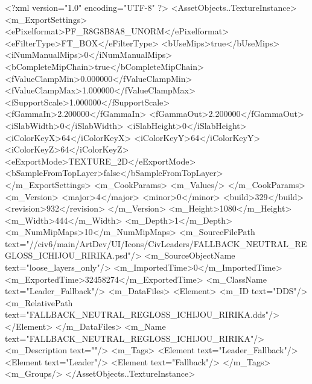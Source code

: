 <?xml version="1.0" encoding="UTF-8" ?>
<AssetObjects..TextureInstance>
	<m_ExportSettings>
		<ePixelformat>PF_R8G8B8A8_UNORM</ePixelformat>
		<eFilterType>FT_BOX</eFilterType>
		<bUseMips>true</bUseMips>
		<iNumManualMips>0</iNumManualMips>
		<bCompleteMipChain>true</bCompleteMipChain>
		<fValueClampMin>0.000000</fValueClampMin>
		<fValueClampMax>1.000000</fValueClampMax>
		<fSupportScale>1.000000</fSupportScale>
		<fGammaIn>2.200000</fGammaIn>
		<fGammaOut>2.200000</fGammaOut>
		<iSlabWidth>0</iSlabWidth>
		<iSlabHeight>0</iSlabHeight>
		<iColorKeyX>64</iColorKeyX>
		<iColorKeyY>64</iColorKeyY>
		<iColorKeyZ>64</iColorKeyZ>
		<eExportMode>TEXTURE_2D</eExportMode>
		<bSampleFromTopLayer>false</bSampleFromTopLayer>
	</m_ExportSettings>
	<m_CookParams>
		<m_Values/>
	</m_CookParams>
	<m_Version>
		<major>4</major>
		<minor>0</minor>
		<build>329</build>
		<revision>932</revision>
	</m_Version>
	<m_Height>1080</m_Height>
	<m_Width>444</m_Width>
	<m_Depth>1</m_Depth>
	<m_NumMipMaps>10</m_NumMipMaps>
	<m_SourceFilePath text="//civ6/main/ArtDev/UI/Icons/CivLeaders/FALLBACK_NEUTRAL_REGLOSS_ICHIJOU_RIRIKA.psd"/>
	<m_SourceObjectName text="loose_layers_only"/>
	<m_ImportedTime>0</m_ImportedTime>
	<m_ExportedTime>32458274</m_ExportedTime>
	<m_ClassName text="Leader_Fallback"/>
	<m_DataFiles>
		<Element>
			<m_ID text="DDS"/>
			<m_RelativePath text="FALLBACK_NEUTRAL_REGLOSS_ICHIJOU_RIRIKA.dds"/>
		</Element>
	</m_DataFiles>
	<m_Name text="FALLBACK_NEUTRAL_REGLOSS_ICHIJOU_RIRIKA"/>
	<m_Description text=""/>
	<m_Tags>
		<Element text="Leader_Fallback"/>
		<Element text="Leader"/>
		<Element text="Fallback"/>
	</m_Tags>
	<m_Groups/>
</AssetObjects..TextureInstance>

